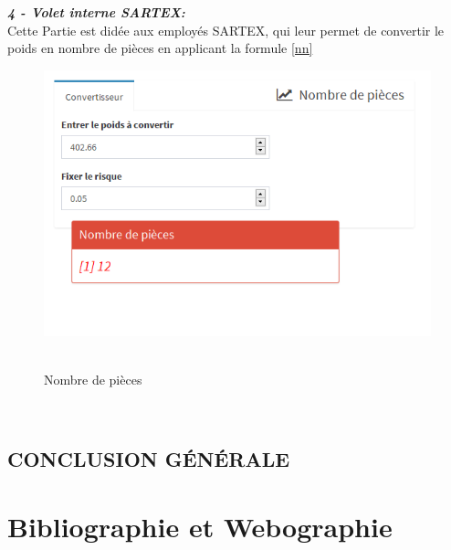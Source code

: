 \documentclass[12pt, a4paper]{thesis}
\begin{document}
 
 
\textit{\textbf{4 - Volet interne SARTEX:}} \\

Cette Partie est didée aux employés SARTEX, qui leur permet de convertir le poids en nombre de pièces en applicant la formule \eqref{nn} 


 
 \begin{figure}[!h]
\includegraphics[scale=0.7]{appconv}\
\caption{Nombre de pièces}
\end{figure}\\
 
 
 
 















\newpage
\section*{CONCLUSION GÉNÉRALE}

\thispagestyle{fancy}


\newpage
\chapter*{Bibliographie et Webographie}
\thispagestyle{fancy}
\end{document}
